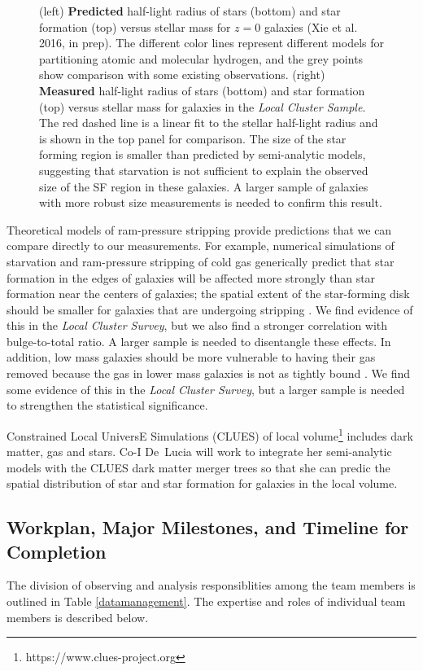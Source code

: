 \documentclass[11pt, preprint]{aastex}
\begin{document}
{\begin{figure}[h!]
\begin{center}
\end{center}
\caption{\small (left) {\bf Predicted} half-light radius
  of stars (bottom) and star formation (top) versus stellar mass for
  $z = 0 $ galaxies (Xie et al. 2016, in prep).
  The different color lines represent different models for partitioning
  atomic and molecular hydrogen, and the grey points show comparison
  with some existing observations.  
(right) {\bf Measured} half-light radius of stars (bottom) and star
formation (top) versus stellar mass for galaxies in the {\it Local Cluster Sample}.  The
red dashed line is a linear fit to the stellar half-light radius and
is shown in the top panel for comparison.  The size of the star
forming region is smaller than predicted by semi-analytic models,
suggesting that starvation is not sufficient to explain the observed
size of the SF region in these galaxies.  A larger sample of galaxies
with more robust size measurements is needed to confirm this result.}
\label{lizhi_comparison}
\end{figure}



Theoretical models of ram-pressure stripping provide predictions that
we can compare directly to our measurements.
For example, numerical simulations of starvation and ram-pressure stripping of cold gas 
generically predict that star formation in the edges
of galaxies will be affected more strongly than star formation near the
centers of galaxies; the spatial extent of the star-forming disk
should be smaller for galaxies that are undergoing stripping \citep[e.g.][]{kawata08, bekki14}.
We find evidence of this in the {\it Local Cluster Survey}, but we
also find a stronger correlation with bulge-to-total ratio.  A larger
sample is needed to disentangle these effects.
In addition, low mass galaxies should be more
vulnerable to having their gas removed 
because the gas in lower mass galaxies is not as tightly
bound \citep[e.g.][]{kawata08, mccarthy07, bekki14}.  We find
some evidence of this in the {\it Local Cluster Survey}, but a larger
sample is needed to strengthen the statistical significance. 

Constrained Local UniversE Simulations (CLUES) of local
volume\footnote{https://www.clues-project.org} includes dark matter,
gas and stars.
Co-I De~Lucia will work to integrate her semi-analytic models with the
CLUES  dark matter merger trees so that she can predic the spatial
distribution of star and star formation for galaxies in the local volume.

\vspace*{-.9cm}\subsection{Workplan, Major Milestones, and Timeline for Completion }
\vspace*{-.3cm}
The division of observing and analysis responsiblities among the team
members is outlined in Table \ref{datamanagement}.   The expertise and
roles of individual team members is described below.

}
\end{document}
